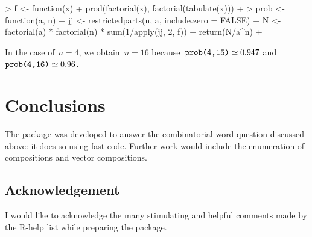 \documentclass[nojss]{jss}
\begin{document}
\begin{Schunk}
\begin{Sinput}
> f <- function(x) {
+     prod(factorial(x), factorial(tabulate(x)))
+ }
> prob <- function(a, n) {
+     jj <- restrictedparts(n, a, include.zero = FALSE)
+     N <- factorial(a) * factorial(n) * sum(1/apply(jj, 2, f))
+     return(N/a^n)
+ }
\end{Sinput}
\end{Schunk}

In the case of~$a=4$, we obtain~$n=16$
because~$\mbox{\code{prob(4,15)}}\simeq\mbox{0.947}$
and~$\mbox{\code{prob(4,16)}}\simeq\mbox{0.96}$.

\section{Conclusions}
The  package was developed to answer the combinatorial
word question discussed above: it does so using fast 
code.  Further work would include the enumeration of compositions and
vector compositions.

\subsection*{Acknowledgement}
I would like to acknowledge the many stimulating and helpful comments
made by the R-help list while preparing the package.


\end{document}
